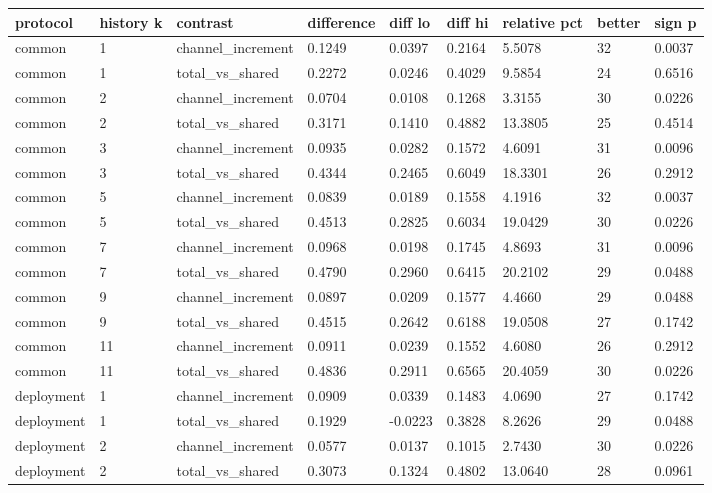 {\footnotesize\setlength{\tabcolsep}{3pt}
\begin{longtable}{lllllllll}
\toprule
\textbf{protocol} & \textbf{history k} & \textbf{contrast} & \textbf{difference} & \textbf{diff lo} & \textbf{diff hi} & \textbf{relative pct} & \textbf{better} & \textbf{sign p} \\
\midrule
\endhead
common & 1 & channel\_increment & 0.1249 & 0.0397 & 0.2164 & 5.5078 & 32 & 0.0037 \\
common & 1 & total\_vs\_shared & 0.2272 & 0.0246 & 0.4029 & 9.5854 & 24 & 0.6516 \\
common & 2 & channel\_increment & 0.0704 & 0.0108 & 0.1268 & 3.3155 & 30 & 0.0226 \\
common & 2 & total\_vs\_shared & 0.3171 & 0.1410 & 0.4882 & 13.3805 & 25 & 0.4514 \\
common & 3 & channel\_increment & 0.0935 & 0.0282 & 0.1572 & 4.6091 & 31 & 0.0096 \\
common & 3 & total\_vs\_shared & 0.4344 & 0.2465 & 0.6049 & 18.3301 & 26 & 0.2912 \\
common & 5 & channel\_increment & 0.0839 & 0.0189 & 0.1558 & 4.1916 & 32 & 0.0037 \\
common & 5 & total\_vs\_shared & 0.4513 & 0.2825 & 0.6034 & 19.0429 & 30 & 0.0226 \\
common & 7 & channel\_increment & 0.0968 & 0.0198 & 0.1745 & 4.8693 & 31 & 0.0096 \\
common & 7 & total\_vs\_shared & 0.4790 & 0.2960 & 0.6415 & 20.2102 & 29 & 0.0488 \\
common & 9 & channel\_increment & 0.0897 & 0.0209 & 0.1577 & 4.4660 & 29 & 0.0488 \\
common & 9 & total\_vs\_shared & 0.4515 & 0.2642 & 0.6188 & 19.0508 & 27 & 0.1742 \\
common & 11 & channel\_increment & 0.0911 & 0.0239 & 0.1552 & 4.6080 & 26 & 0.2912 \\
common & 11 & total\_vs\_shared & 0.4836 & 0.2911 & 0.6565 & 20.4059 & 30 & 0.0226 \\
deployment & 1 & channel\_increment & 0.0909 & 0.0339 & 0.1483 & 4.0690 & 27 & 0.1742 \\
deployment & 1 & total\_vs\_shared & 0.1929 & -0.0223 & 0.3828 & 8.2626 & 29 & 0.0488 \\
deployment & 2 & channel\_increment & 0.0577 & 0.0137 & 0.1015 & 2.7430 & 30 & 0.0226 \\
deployment & 2 & total\_vs\_shared & 0.3073 & 0.1324 & 0.4802 & 13.0640 & 28 & 0.0961 \\

\end{longtable}}
